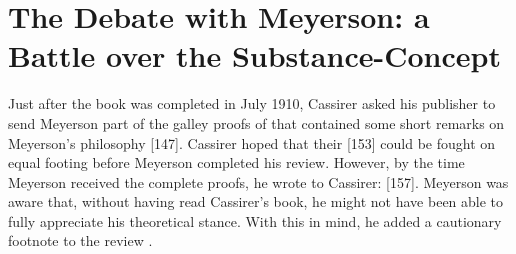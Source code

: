 \documentclass[submitted,12pt]{article}
\begin{document}
 
\section{The Debate with Meyerson: a Battle over the Substance-Concept}
\label{sec:meyerson}
%
Just after the book was completed in July 1910, Cassirer asked his publisher to send Meyerson part of the galley proofs of \SFt that contained some short remarks on Meyerson's philosophy  [147]. Cassirer hoped that their  [153] could be fought on equal footing before Meyerson completed his review. However, by the time Meyerson received the complete proofs, he wrote to Cassirer:  [157]. Meyerson was aware that, without having read Cassirer’s book, he might not have been able to fully appreciate his theoretical stance. With this in mind, he added a cautionary footnote to the review \citep[123]{Meyerson1911}.
\end{document}

